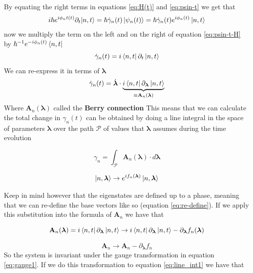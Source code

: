     By equating the right terms in equations \ref{eq:H(t)} and \ref{eq:psin-t} we get that 
    \begin{equation}
        \label{eq:psin-t-H}
            i\hbar e^{i\phi_nt(t)}\partial_t|n,t\rangle=\hbar\dot \gamma_n(t)\ket{\psi_n(t)} =\hbar\dot \gamma_n(t)e^{i\phi_n(t)}\ket{n,t}
    \end{equation}    
    now we multiply the term on the left and on the right of equation \ref{eq:psin-t-H} by $\hbar^{-1}e^{-i\phi_n(t)} \bra{n,t}$
    \begin{equation}
        \label{eq:psin-t-H-bra}
            \dot \gamma_n(t)=i\bra{n,t} \partial_t\ket{n,t}
    \end{equation}
    We can re-express it in terms of $\boldsymbol \lambda$
    \begin{equation}
        \label{eq:connection}
            \dot \gamma_n(t)=\dot{\boldsymbol \lambda}\cdot\underbrace{i\bra{n,t} \partial_{\boldsymbol \lambda}\ket{n,t}}_{\equiv \mathbf A_n(\boldsymbol \lambda)}
    \end{equation}
    Where $\mathbf A_n(\boldsymbol \lambda)$ called the \textbf{Berry connection}
    This means that we can calculate the total change in $\gamma_n(t)$ can be obtained by doing a line integral in the space of parameters $\boldsymbol \lambda$ over the path $\mathcal P$ of values that $\boldsymbol \lambda$ assumes during the time evolution

    \begin{equation}
        \label{eq:line_int1}
            \gamma_n=\int_\mathcal{P} \mathbf A_n(\boldsymbol \lambda) \cdot d\boldsymbol \lambda
    \end{equation}


    \begin{equation}
        \label{eq:re-define}
        \ket{n,\boldsymbol \lambda}\to e^{if_n(\boldsymbol \lambda)}\ket{n,\boldsymbol \lambda}
    \end{equation}

    Keep in mind however that the eigenstates are defined up to a phase, meaning that we can re-define the base vectors like so 
    (equation \ref{eq:re-define}). If we apply this substitution
    into the formula of $\mathbf A_n$ we have that

    \[
    \mathbf A_n(\boldsymbol \lambda) =i\bra{n,t} \partial_{\boldsymbol \lambda}\ket{n,t}\to i\bra{n,t} \partial_{\boldsymbol \lambda}\ket{n,t} - \partial_{\boldsymbol \lambda}f_n(\boldsymbol \lambda)
    \]

    \begin{equation}
        \label{eq:gauge1}
        \mathbf A_n \to \mathbf A_n - \partial_{\boldsymbol \lambda}f_n
    \end{equation}
        So the system is invariant under the gauge transformation in equation \ref{eq:gauge1}.  If we do this transformation to equation \ref{eq:line_int1} we have that

